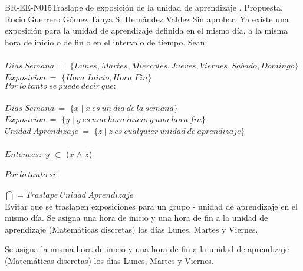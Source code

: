 \begin{BusinessRule}{BR-EE-N015}{Traslape de exposición de la unidad de aprendizaje}
	{\bcCondition}    %
	{\btEnabler}     %
	{\blControlling}    %
	.
	\BRItem[Estado] Propuesta.
	 Rocio Guerrero Gómez
	 Tanya S. Hernández Valdez
	 Sin aprobar.
	\BRItem[Descripción] Ya existe una exposición para la unidad de aprendizaje definida en el mismo día, a la misma hora de inicio o de fin o en el intervalo de tiempo.
	\BRItem[Sentencia]  Sean: \\\\
	$Dias\ Semana\ =$ $\{Lunes, Martes, Miercoles, Jueves, Viernes, Sabado, Domingo\}$ \\
	$Exposicion\ =$ $\{Hora\_Inicio, Hora\_Fin\}$ \\
	$Por\ lo\ tanto\ se\ puede\ decir\ que:$ \\\\
	$Dias\ Semana\ =$ $\{x \mid x\ es\ un\ dia\ de\ la\ semana\}$\\
	$Exposicion\ =$ $\{y \mid y\ es\ una\ hora\ inicio\ y\ una\ hora\ fin\}$ \\
	$Unidad\ Aprendizaje\ =$ $\{z \mid z\ es\ cualquier\ unidad\ de\ aprendizaje\}$ \\\\
	$Entonces:$ $y$ $\subset$ ($x$ $\wedge$ $z$) \\\\
	$Por\ lo\ tanto\ si:$\\\\
	 $\bigcap$  = $Traslape\ Unidad\ Aprendizaje$ \\
	\BRItem[Motivación] Evitar que se traslapen exposiciones para un grupo - unidad de aprendizaje en el mismo día.
	 \cdtEmpty
		Se asigna una hora de inicio y una hora de fin a la unidad de aprendizaje (Matemáticas discretas) los días Lunes, Martes y Viernes.

	 \cdtEmpty
		Se asigna la misma hora de inicio y una hora de fin a la unidad de aprendizaje (Matemáticas discretas) los días Lunes, Martes y Viernes.	
\end{BusinessRule}

